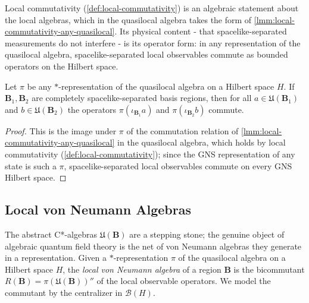 Local commutativity (\ref{def:local-commutativity}) is an algebraic statement about the local algebras, which in the quasilocal algebra takes the form of \ref{lmm:local-commutativity-any-quasilocal}. Its physical content - that spacelike-separated measurements do not interfere - is its operator form: in any representation of the quasilocal algebra, spacelike-separated local observables commute as bounded operators on the Hilbert space.

\begin{theorem}
    \label{thrm:einstein-causality}
    \leanok
    Let $\pi$ be any $*$-representation of the quasilocal algebra on a Hilbert space $H$. If $\mathbf{B}_1, \mathbf{B}_2$ are completely spacelike-separated basis regions, then for all $a \in \mathfrak{U}(\mathbf{B}_1)$ and $b \in \mathfrak{U}(\mathbf{B}_2)$ the operators $\pi(\iota_{\mathbf{B}_1} a)$ and $\pi(\iota_{\mathbf{B}_2} b)$ commute.
\end{theorem}
\begin{proof}
    \leanok
    This is the image under $\pi$ of the commutation relation of \ref{lmm:local-commutativity-any-quasilocal} in the quasilocal algebra, which holds by local commutativity (\ref{def:local-commutativity}); since the GNS representation of any state is such a $\pi$, spacelike-separated local observables commute on every GNS Hilbert space.
\end{proof}

\subsection{Local von Neumann Algebras}

The abstract C*-algebras $\mathfrak{U}(\mathbf{B})$ are a stepping stone; the genuine object of algebraic quantum field theory is the net of von Neumann algebras they generate in a representation. Given a $*$-representation $\pi$ of the quasilocal algebra on a Hilbert space $H$, the \emph{local von Neumann algebra} of a region $\mathbf{B}$ is the bicommutant $R(\mathbf{B}) = \pi(\mathfrak{U}(\mathbf{B}))''$ of the local observable operators. We model the commutant by the centralizer in $\mathcal{B}(H)$.

